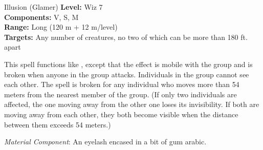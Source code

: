 {Illusion (Glamer)}
{
	\textbf{Level:}
	Wiz 7\\
	\textbf{Components:}
	V, S, M\\
	\textbf{Range:}
	Long (120 m + 12 m/level)\\
	\textbf{Targets:}
	Any number of creatures, no two of which can be more than 180 ft. apart\\
}
{
	This spell functions like , except that the effect is mobile with the group and is broken when anyone in the group attacks. Individuals in the group cannot see each other. The spell is broken for any individual who moves more than 54 meters from the nearest member of the group. (If only two individuals are affected, the one moving away from the other one loses its invisibility. If both are moving away from each other, they both become visible when the distance between them exceeds 54 meters.)

	\textit{Material Component}:
	An eyelash encased in a bit of gum arabic.

}
